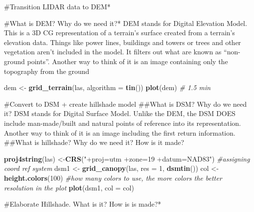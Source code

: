 \documentclass[]{article}
\newenvironment{Shaded}{\begin{snugshade}}{\end{snugshade}}
\newcommand{\CommentTok}[1]{\textcolor[rgb]{0.56,0.35,0.01}{\textit{#1}}}
\newcommand{\DataTypeTok}[1]{\textcolor[rgb]{0.13,0.29,0.53}{#1}}
\newcommand{\DecValTok}[1]{\textcolor[rgb]{0.00,0.00,0.81}{#1}}
\newcommand{\KeywordTok}[1]{\textcolor[rgb]{0.13,0.29,0.53}{\textbf{#1}}}
\newcommand{\NormalTok}[1]{#1}
\newcommand{\StringTok}[1]{\textcolor[rgb]{0.31,0.60,0.02}{#1}}
\begin{document}
\#Transition LIDAR data to DEM*

\#What is DEM? Why do we need it?* DEM stands for Digital Elevation
Model. This is a 3D CG representation of a terrain's surface created
from a terrain's elevation data. Things like power lines, buildings and
towers or trees and other vegetation aren't included in the model. It
filters out what are known as ``non-ground points''. Another way to
think of it is an image containing only the topography from the ground

\begin{Shaded}
\begin{Highlighting}[]
\NormalTok{dem <-}\StringTok{  }\KeywordTok{grid_terrain}\NormalTok{(las, }\DataTypeTok{algorithm =} \KeywordTok{tin}\NormalTok{())}
\KeywordTok{plot}\NormalTok{(dem) }\CommentTok{# 1.5 min}
\end{Highlighting}
\end{Shaded}

\#Convert to DSM + create hillshade model \#\#What is DSM? Why do we
need it? DSM stands for Digital Surface Model. Unlike the DEM, the DSM
DOES include man-made/built and natural points of reference into its
representation. Another way to think of it is an image including the
first return information. \#\#What is hillshade? Why do we need it? How
is it made?

\begin{Shaded}
\begin{Highlighting}[]
\KeywordTok{proj4string}\NormalTok{(las) <-}\KeywordTok{CRS}\NormalTok{(}\StringTok{"+proj=utm +zone=19 +datum=NAD83"}\NormalTok{) }\CommentTok{#assigning coord ref system}
\NormalTok{dsm1 <-}\StringTok{ }\KeywordTok{grid_canopy}\NormalTok{(las, }\DataTypeTok{res =} \DecValTok{1}\NormalTok{, }\KeywordTok{dsmtin}\NormalTok{())}
\NormalTok{col <-}\StringTok{ }\KeywordTok{height.colors}\NormalTok{(}\DecValTok{100}\NormalTok{) }\CommentTok{#how many colors to use, the more colors the better resolution in the plot}
\KeywordTok{plot}\NormalTok{(dsm1, }\DataTypeTok{col =}\NormalTok{ col)}
\end{Highlighting}
\end{Shaded}

\#Elaborate Hillshade. What is it? How is is made?*
\end{document}
